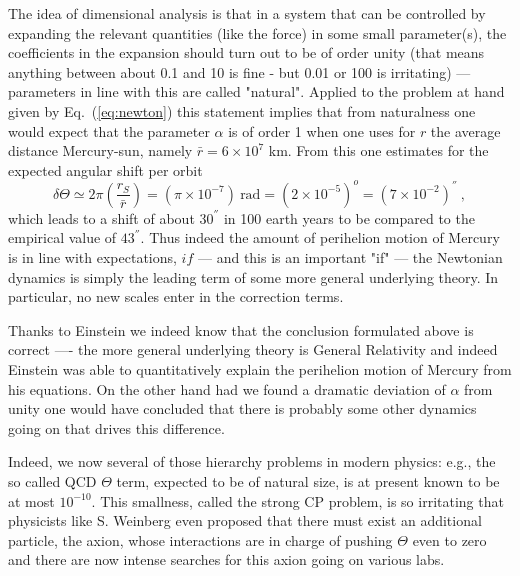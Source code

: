 \documentclass[12pt, UK english]{iopart}
\begin{document}
The idea of dimensional analysis is that in a system that can be controlled by expanding the relevant quantities (like the force) in some small parameter(s), the coefficients in the expansion should turn out to be of order unity (that means anything between about 0.1 and 10 is fine - but 0.01 or 100 is irritating) --- parameters in line with this are called "natural".
Applied to the problem at hand given by Eq.~(\ref{eq:newton}) this statement implies that from naturalness one would expect that the parameter $\alpha$ is of order 1 when one uses for $r$ the average distance Mercury-sun, namely $\bar r=6\times 10^7$ km.
From this one estimates for the expected angular shift per orbit
\begin{equation}
\delta \Theta \simeq 2\pi\left(\frac{r_S}{\bar r}\right) = (\pi \times 10^{-7}) \ \mbox{rad} = (2\times 10^{-5})^o = (7\times 10^{-2}) ^{''} \ ,
\end{equation}
which leads to a shift of about $30^{''}$ in 100 earth years to be compared to the empirical value of $43^{''}$.
Thus indeed the amount of perihelion motion of Mercury is in line with expectations, $if$ --- and this is an important "if" --- the Newtonian dynamics is simply the leading term of some more general underlying theory.
In particular, no new scales enter in the correction terms.

Thanks to Einstein we indeed know that the conclusion formulated above is correct ---- the more general underlying theory is General Relativity and indeed Einstein was able to quantitatively explain the perihelion motion of Mercury from his equations. 
On the other hand had we found a dramatic deviation of $\alpha$ from unity one would have concluded that there is probably some other dynamics going on that drives this difference.

Indeed, we now several of those hierarchy problems in modern physics: e.g., the so called QCD $\Theta$ term, expected to be of natural size, is at present known to be at most $10^{-10}$.
This smallness, called the strong CP problem, is so irritating that physicists like S. Weinberg even proposed that there must exist an additional particle, the axion, whose interactions are in charge of pushing $\Theta$ even to zero and there are now intense searches for this axion going on various labs.



\end{document}
